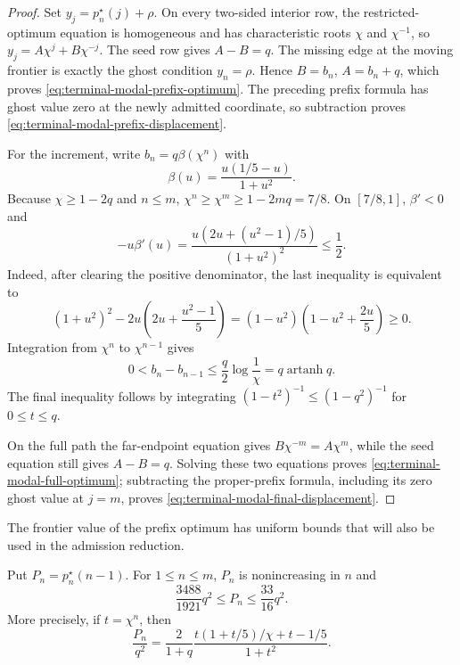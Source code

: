 \begin{proof}
Set $y_j=p_n^\star(j)+\rho$.  On every two-sided interior row, the
restricted-optimum equation is homogeneous and has characteristic roots
$\chi$ and $\chi^{-1}$, so $y_j=A\chi^j+B\chi^{-j}$.  The seed row gives
$A-B=q$.  The missing edge at the moving frontier is exactly the ghost
condition $y_n=\rho$.  Hence $B=b_n$, $A=b_n+q$, which proves
\eqref{eq:terminal-modal-prefix-optimum}.  The preceding prefix formula has
ghost value zero at the newly admitted coordinate, so subtraction proves
\eqref{eq:terminal-modal-prefix-displacement}.

For the increment, write $b_n=q\beta(\chi^n)$ with
\[
 \beta(u)=\frac{u(1/5-u)}{1+u^2}.
\]
Because $\chi\ge1-2q$ and $n\le m$,
$\chi^n\ge\chi^m\ge1-2mq=7/8$.  On $[7/8,1]$, $\beta'<0$ and
\[
 -u\beta'(u)=\frac{u(2u+(u^2-1)/5)}{(1+u^2)^2}\le\frac12.
\]
Indeed, after clearing the positive denominator, the last inequality is
equivalent to
\[
 (1+u^2)^2-2u\left(2u+\frac{u^2-1}{5}\right)
 =(1-u^2)\left(1-u^2+\frac{2u}{5}\right)\ge0.
\]
Integration from $\chi^n$ to $\chi^{n-1}$ gives
\[
 0<b_n-b_{n-1}\le\frac q2\log\frac1\chi
 =q\operatorname{artanh}q.
\]
The final inequality follows by integrating
$(1-t^2)^{-1}\le(1-q^2)^{-1}$ for $0\le t\le q$.

On the full path the far-endpoint equation gives
$B\chi^{-m}=A\chi^m$, while the seed equation still gives $A-B=q$.
Solving these two equations proves \eqref{eq:terminal-modal-full-optimum};
subtracting the proper-prefix formula, including its zero ghost value at
$j=m$, proves \eqref{eq:terminal-modal-final-displacement}.
\end{proof}

The frontier value of the prefix optimum has uniform bounds that will also
be used in the admission reduction.

\begin{lemma}
\label{lem:terminal-modal-frontier-bounds}
Put $P_n=p_n^\star(n-1)$.  For $1\le n\le m$, $P_n$ is nonincreasing in $n$
and
\begin{equation}
 \frac{3488}{1921}q^2\le P_n\le\frac{33}{16}q^2.
 \label{eq:terminal-modal-frontier-bounds}
\end{equation}
More precisely, if $t=\chi^n$, then
\begin{equation}
 \frac{P_n}{q^2}=\frac{2}{1+q}
 \frac{t(1+t/5)/\chi+t-1/5}{1+t^2}.
 \label{eq:terminal-modal-frontier-optimum}
\end{equation}
\end{lemma}

